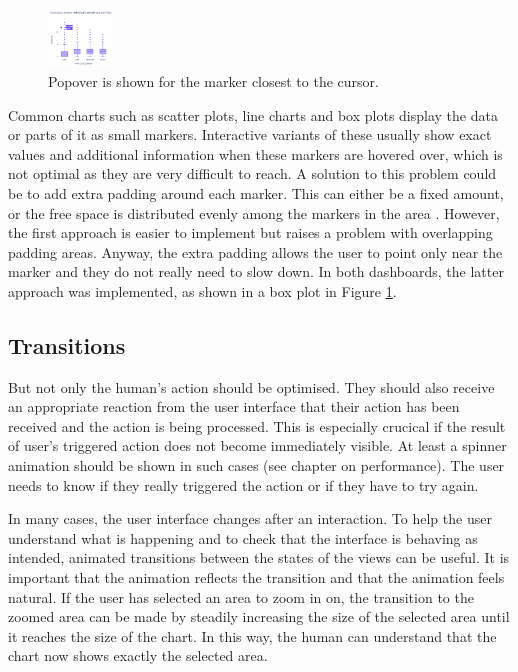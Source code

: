 \documentclass[11pt]{article}
\begin{document}
\begin{figure}
    \includegraphics[width=0.15\textwidth]{./fitts-cursor.png}
    \caption{Popover is shown for the marker closest to the cursor.}
    \label{fitts-cursor}
\end{figure}

Common charts such as scatter plots, line charts and box plots display the data or parts of it as small markers. Interactive variants of these usually show exact values and additional information when these markers are hovered over, which is not optimal as they are very difficult to reach. A solution to this problem could be to add extra padding around each marker. This can either be a fixed amount, or the free space is distributed evenly among the markers in the area \parencite{mccrocklin_interaction_2015}. However, the first approach is easier to implement but raises a problem with overlapping padding areas. Anyway, the extra padding allows the user to point only near the marker and they do not really need to slow down. In both dashboards, the latter approach was implemented, as shown in a box plot in Figure \ref{fitts-cursor}.

\subsection{Transitions}

But not only the human's action should be optimised. They should also receive an appropriate reaction from the user interface that their action has been received and the action is being processed. This is especially crucical if the result of user's triggered action does not become immediately visible. At least a spinner animation should be shown in such cases (see chapter on performance). The user needs to know if they really triggered the action or if they have to try again. 

In many cases, the user interface changes after an interaction. To help the user understand what is happening and to check that the interface is behaving as intended, animated transitions between the states of the views can be useful. It is important that the animation reflects the transition and that the animation feels natural. If the user has selected an area to zoom in on, the transition to the zoomed area can be made by steadily increasing the size of the selected area until it reaches the size of the chart. In this way, the human can understand that the chart now shows exactly the selected area. 
\end{document}
